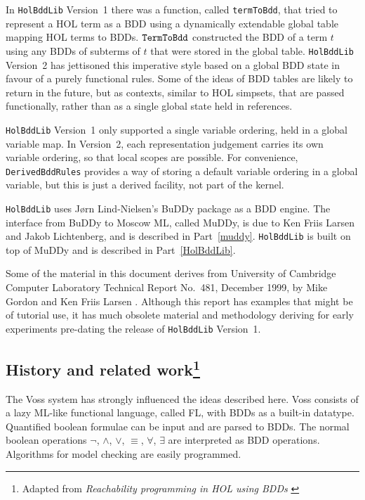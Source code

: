 \documentclass[12pt]{article}
\renewcommand{\t}[1]{\mbox{\tt #1}}
\newcommand\HOL{HOL\xspace}
\newcommand{\Buddy}{BuDDy\xspace}
\newcommand{\Muddy}{MuDDy\xspace}
\begin{document}
In {\tt{HolBddLib}} Version~1 there was a function, called
{\texttt{termToBdd}}, that tried to represent a \HOL{} term as a BDD
using a dynamically extendable global table mapping \HOL{} terms to
BDDs.  $\t{TermToBdd}$ constructed the BDD of a term $t$ using any
BDDs of subterms of $t$ that were stored in the global table.
{\tt{HolBddLib}} Version~2 has jettisoned this imperative style based
on a global BDD state in favour of a purely functional rules. Some of
the ideas of BDD tables are likely to return in the future, but as
contexts, similar to HOL simpsets, that are passed functionally,
rather than as a single global state held in references.

{\tt{HolBddLib}} Version~1 only supported a single variable
ordering, held in a global variable map. In Version~2, each
representation judgement carries its own variable ordering, so that local
scopes are possible. For convenience, {\tt{DerivedBddRules}}
provides a way of storing a default variable ordering in a global
variable, but this is just a derived facility, not part of the kernel.

{\tt HolBddLib} uses J{\o}rn Lind-Nielsen's \Buddy{} package as a BDD
engine. The interface from \Buddy{} to Moscow ML, called \Muddy, is
due to Ken Friis Larsen and Jakob Lichtenberg, and is described in Part~\ref{muddy}.
{\tt HolBddLib} is built on top of \Muddy{} and
is described in Part~\ref{HolBddLib}.

Some of the material in this document derives from University of
Cambridge Computer Laboratory Technical Report No.~481, December 1999,
by Mike Gordon and Ken Friis Larsen \cite{GordonLarsen}. Although this
report has examples that might be of tutorial use, it has much
obsolete material and methodology deriving for early experiments
pre-dating the release of {\tt HolBddLib} Version~1.


\subsection*{History and related work\footnote{Adapted from 
{\it Reachability programming in {HOL} using {BDD}s}
\cite{Gordon:TPHOLs2000}}}\label{related}

The Voss system \cite{SegerVoss} has strongly influenced
the ideas described here. Voss consists of a lazy
ML-like functional language, called FL, with BDDs as a built-in datatype.
Quantified boolean formulae can be input and are parsed to BDDs.
The normal boolean operations $\neg$, $\wedge$, $\vee$, $\equiv$,
$\forall$, $\exists$ are interpreted as BDD operations.  
Algorithms for model checking are easily programmed.
\end{document}
